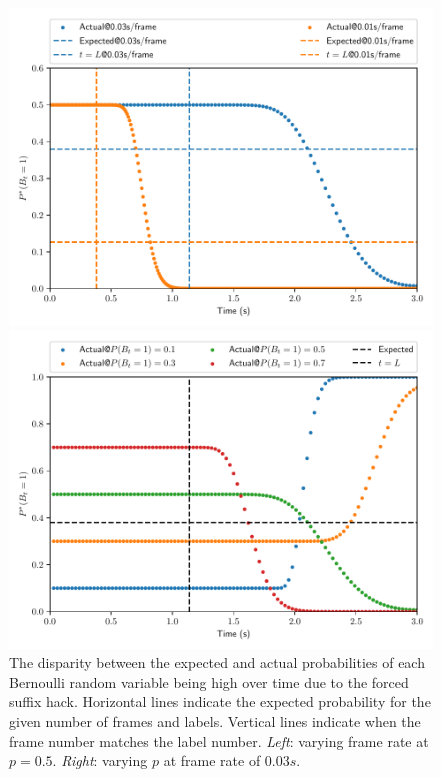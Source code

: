 \documentclass{article}
\begin{document}
\begin{figure}
\centering
\begin{minipage}{0.45\textwidth}
    \includegraphics[width=\textwidth]{fs_compare_fs.pdf}
\end{minipage}
\begin{minipage}{0.45\textwidth}
    \includegraphics[width=\textwidth]{fs_compare_ps.pdf}
\end{minipage}
\caption{
    The disparity between the expected and actual probabilities of each
    Bernoulli random variable being high over time due to the forced suffix
    hack. Horizontal lines indicate the expected probability for the given
    number of frames and labels. Vertical lines indicate when the frame number
    matches the label number. \emph{Left}: varying frame rate at $p = 0.5$.
    \emph{Right}: varying $p$ at frame rate of $0.03s$.
} \label{fig:bias}
\end{figure}
\end{document}
